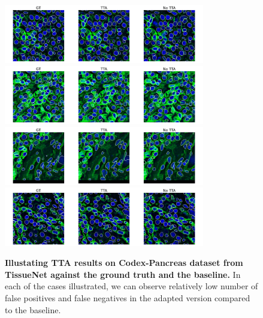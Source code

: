 \begin{table}
    
    \caption{Comparative analysis on various splits of TissueNet. We show improvement with test-time adaptation. }
    \label{tab:tn2}
\end{table}


\begin{figure}
    \includegraphics[width=8.75cm]{figs/1.pdf}
    \includegraphics[width=8.75cm]{figs/43.pdf}
    \includegraphics[width=8.75cm]{figs/45.pdf}
    \includegraphics[width=8.75cm]{figs/55.pdf}
    \caption{\textbf{Illustating TTA results on Codex-Pancreas dataset from TissueNet against the ground truth and the baseline.} In each of the cases illustrated, we can observe relatively low number of false positives and false negatives in the adapted version compared to the baseline.}
    \label{fig:qual}
\end{figure}